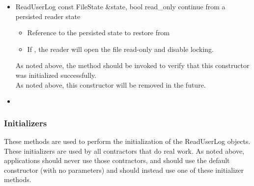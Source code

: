 \begin{itemize}
\item \Constructor
  {ReadUserLog}
  {const FileState \&state, bool read\_only}
  {continue from a persisted reader state}
  \begin{itemize}
  \item {}
    Reference to the persisted state to restore from
  \item {}
    If , the reader will open the file read-only and
    disable locking.
  \end{itemize}
  \Note As noted above, the 
  method should be invoked to verify that this constructor was
  initialized successfully.
  \\ \Note As noted above, this constructor will be removed in the future.

\item {}

\end{itemize}


\subsubsection{Initializers}
These methods are used to perform the initialization of the
ReadUserLog objects.  These initializers are used by all contractors
that do real work.  As noted above, applications should never use
those contractors, and should use the default constructor (with no
parameters) and should instead use one of these initializer methods.

